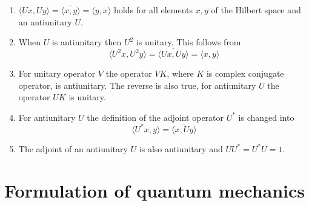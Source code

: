 \documentclass[cyan]{elegantnote}
\begin{document}
\begin{newprop}
\begin{enumerate}
\item $\langle Ux,Uy\rangle =\overline {\langle x,y\rangle }=\langle y,x\rangle$ holds for all elements $x, y$ of the Hilbert space and an antiunitary $U$.
\item When $U$ is antiunitary then $U^{2}$ is unitary. This follows from
\[ \langle U^{2}x,U^{2}y\rangle =\overline {\langle Ux,Uy\rangle }=\langle x,y\rangle\]
\item For unitary operator $V$ the operator $VK$, where $K$ is complex conjugate operator, is antiunitary. The reverse is also true, for antiunitary $U$ the operator $UK$ is unitary.
\item For antiunitary $U$ the definition of the adjoint operator $U^{*}$ is changed into
\[\langle U^{*}x,y\rangle =\overline {\langle x,Uy\rangle }\]
\item The adjoint of an antiunitary $U$ is also antiunitary and $UU^{*}=U^{*}U=1$.
\end{enumerate}
\end{newprop}

\chapter{Formulation of quantum mechanics}
\end{document}

